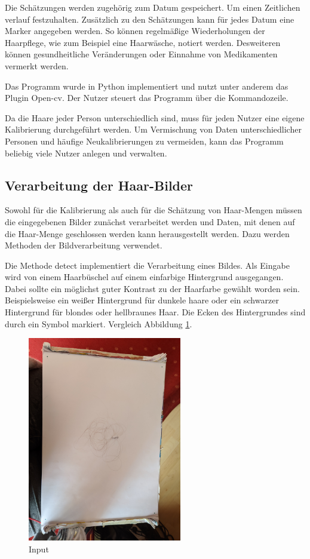 \documentclass[german,a4paper, 12pt]{scrartcl}
\begin{document}
Die Schätzungen werden zugehörig zum Datum gespeichert. Um einen Zeitlichen verlauf festzuhalten.
Zusätzlich zu den Schätzungen kann für jedes Datum eine Marker angegeben werden. So können regelmäßige Wiederholungen der Haarpflege, wie zum Beispiel eine Haarwäsche, notiert werden. Desweiteren können gesundheitliche Veränderungen oder Einnahme von Medikamenten vermerkt werden.

Das Programm wurde in Python implementiert und nutzt unter anderem das Plugin Open-cv.
Der Nutzer steuert das Programm über die Kommandozeile. 

Da die Haare jeder Person unterschiedlich sind, muss für jeden Nutzer eine eigene Kalibrierung durchgeführt werden. Um Vermischung von Daten unterschiedlicher Personen und häufige Neukalibrierungen zu vermeiden, kann das Programm beliebig viele Nutzer anlegen und verwalten. 

\subsection{Verarbeitung der Haar-Bilder}

Sowohl für die Kalibrierung als auch für die Schätzung von Haar-Mengen müssen die eingegebenen Bilder zunächst verarbeitet werden und Daten, mit denen auf die Haar-Menge geschlossen werden kann herausgestellt werden. Dazu werden Methoden der Bildverarbeitung verwendet.

Die Methode detect implementiert die Verarbeitung eines Bildes.
Als Eingabe wird von einem Haarbüschel auf einem einfarbige Hintergrund ausgegangen. Dabei sollte ein möglichst guter Kontrast zu der Haarfarbe gewählt worden sein. Beispielsweise ein weißer Hintergrund für dunkele haare oder ein schwarzer Hintergrund für blondes oder hellbraunes Haar. Die Ecken des Hintergrundes sind durch ein Symbol markiert. Vergleich Abbildung \ref{img:input}.

\begin{figure}[H]
	\centering
	\includegraphics[width=0.6\textwidth]{fig64/00IMG_20200406_153354_12_g_15.jpg}
	\caption[]{Input}
	\label{img:input}
\end{figure}
\end{document}
